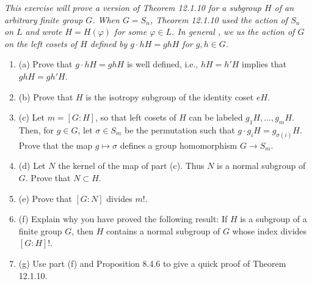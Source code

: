 \documentclass[11pt,a4paper]{article}
\newcommand{\be} {\begin{enumerate}}
\newcommand{\ee} {\end{enumerate}}
\begin{document}
{\it This exercise will prove a version of Theorem 12.1.10 for a subgroup $H$ of an arbitrary finite group $G$. When $G=S_n$, Theorem 12.1.10 used the action of $S_n$ on $L$ and wrote $H = H(\varphi)$ for some $\varphi \in L$. In general , we us the action of $G$ on the left cosets of $H$ defined by $g\cdot hH = ghH$ for $g,h \in G$.
\be
\item[(a)] Prove that $g\cdot hH = gh H$ is well defined, i.e., $hH = h'H$ implies that $ghH = gh'H$.
\item[(b)] Prove that $H$ is the isotropy subgroup of the identity coset $eH$.
\item[(c)] Let $m=[G:H]$, so that left cosets of $H$ can be labeled $g_1H,\ldots,g_mH$. Then, for $g\in G$, let $\sigma \in S_m$ be the permutation such that $g\cdot g_iH = g_{\sigma(i)}H$. Prove that the map $g\mapsto \sigma$ defines a group homomorphism $G \to S_m$.
\item[(d)] Let $N$ the kernel of the map of part (c). Thus $N$ is a normal subgroup of $G$. Prove that $N \subset H$.
\item[(e)] Prove that $[G:N]$ divides $m!$.
\item[(f)] Explain why you have proved the following result: If $H$ is a subgroup of a finite group $G$, then $H$ contains a normal subgroup of $G$ whose index divides $[G:H]!$.
\item[(g)] Use part (f) and Proposition 8.4.6 to give a quick proof of Theorem 12.1.10.
\ee
}
\end{document}
